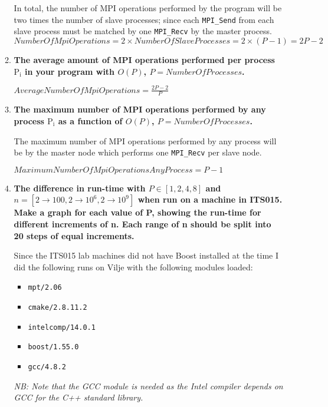 \begin{enumerate}
\begin{enumerate}
In total, the number of MPI operations performed by the program will be two times the number of slave processes; since each \texttt{MPI\_Send} from each slave process must be matched by one \texttt{MPI\_Recv} by the master process. 
$$\textit{NumberOfMpiOperations} = 2 \times \textit{NumberOfSlaveProcesses} = 2 \times (P - 1) = 2P - 2$$

\item \textbf{The average amount of MPI operations performed per process $\text{P}_\text{i}$ in your program with $O(P)$, $P = NumberOfProcesses$.}

$\textit{AverageNumberOfMpiOperations} = \frac{2P - 2}{P}$

\item \textbf{The maximum number of MPI operations performed by any process $\text{P}_\text{i}$ as a function of $O(P)$, $P = NumberOfProcesses$.}

The maximum number of MPI operations performed by any process will be by the master node which performs one \texttt{MPI\_Recv} per slave node.

$\textit{MaximumNumberOfMpiOperationsAnyProcess} = P - 1$

\item \textbf{The difference in run-time with $P \in [1, 2, 4, 8]$ and $n = [2 \to 100, 2 \to 10^6, 2 \to 10^9]$ when run on a machine in ITS015.\\Make a graph for each value of P, showing the run-time for different increments of n. Each range of n should be split into 20 steps of equal increments.}

Since the ITS015 lab machines did not have Boost installed at the time I did the following runs on Vilje with the following modules loaded:

\begin{itemize}
\item \texttt{mpt/2.06}
\item \texttt{cmake/2.8.11.2}
\item \texttt{intelcomp/14.0.1}
\item \texttt{boost/1.55.0}
\item \texttt{gcc/4.8.2}
\end{itemize}

\textit{NB: Note that the GCC module is needed as the Intel compiler depends on GCC for the C++ standard library.}

\newpage

\begin{center}


\end{center}
\end{enumerate}
\end{enumerate}
